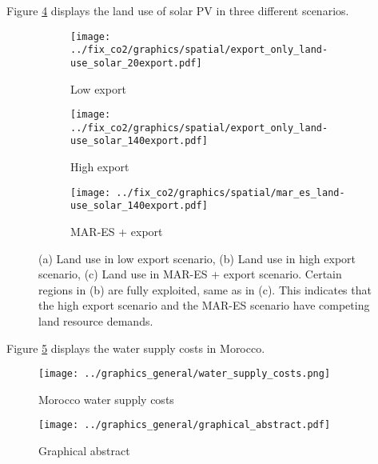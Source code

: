 Figure \ref{fig:land_use_solar} displays the land use of solar PV in three different scenarios.

\begin{figure}[h]
    \centering
    \begin{subfigure}[b]{0.3\textwidth}
        \texttt{[image: ../fix\_co2/graphics/spatial/export\_only\_land-use\_solar\_20export.pdf]}
        \caption{Low export}
        \label{fig:graphic1}
    \end{subfigure}
    \begin{subfigure}[b]{0.3\textwidth}
        \texttt{[image: ../fix\_co2/graphics/spatial/export\_only\_land-use\_solar\_140export.pdf]}
        \caption{High export}
        \label{fig:graphic2}
    \end{subfigure}
    \begin{subfigure}[b]{0.3\textwidth}
        \texttt{[image: ../fix\_co2/graphics/spatial/mar\_es\_land-use\_solar\_140export.pdf]}
        \caption{MAR-ES + export}
        \label{fig:graphic3}
    \end{subfigure}
    \caption{(a) Land use in low export scenario, (b) Land use in high export scenario, (c) Land use in MAR-ES + export scenario. Certain regions in
    (b) are fully exploited, same as in (c). This indicates that the high export scenario and the MAR-ES scenario have competing land resource demands.}
    \label{fig:land_use_solar}
\end{figure}
    
Figure \ref{fig:morocco_water} displays the water supply costs in Morocco.

\begin{figure}[h!]
    \centering
    \texttt{[image: ../graphics\_general/water\_supply\_costs.png]}
    \caption{Morocco water supply costs}
    \label{fig:morocco_water}
\end{figure}


\begin{figure}[h!]
    \centering
    \texttt{[image: ../graphics\_general/graphical\_abstract.pdf]}
    \caption{Graphical abstract}
    \label{fig:graphical_abstract}
\end{figure}